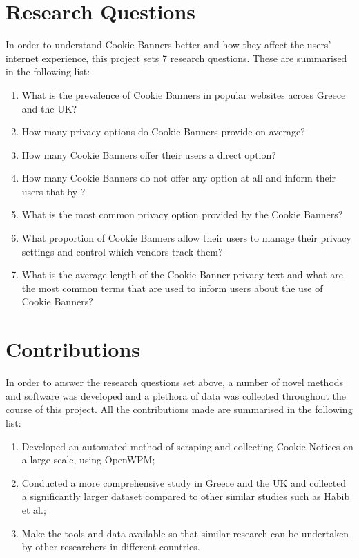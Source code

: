 \documentclass[../main.tex]{subfiles}
\begin{document}
\section{Research Questions}

In order to understand Cookie Banners better and how they affect the users’ internet experience, this project sets 7 research questions. These are summarised in the following list:

\begin{enumerate}[label=\textbf{RQ\arabic*}:, ref=RQ\arabic*, leftmargin=1.65cm]
    \item \label{rq:prevalence} What is the prevalence of Cookie Banners in popular websites across Greece and the UK? 
    \item \label{rq:options_avg} How many privacy options do Cookie Banners provide on average?
    \item \label{rq:direct_opt_out} How many Cookie Banners offer their users a direct  option?
    \item \label{rq:no_options} How many Cookie Banners do not offer any option at all and inform their users that by ?
    \item \label{rq:common_ctas} What is the most common privacy option provided by the Cookie Banners? 
    \item \label{rq:manage_options_count} What proportion of Cookie Banners allow their users to manage their privacy settings and control which vendors track them?
    \item \label{rq:common_privacy_txt} What is the average length of the Cookie Banner privacy text and what are the most common terms that are used to inform users about the use of Cookie Banners?
\end{enumerate}
    
\section{Contributions}

In order to answer the research questions set above, a number of novel methods and software was developed and a plethora of data was collected throughout the course of this project. All the contributions made are summarised in the following list:

\begin{enumerate}
    \item \label{contr_1} Developed an automated method of scraping and collecting Cookie Notices on a large scale, using OpenWPM;
    \item \label{contr_2} Conducted a more comprehensive study in Greece and the UK and collected a significantly larger dataset compared to other similar studies such as Habib et al.;
    \item \label{contr_3} Make the tools and data available so that similar research can be undertaken by other researchers in different countries.
\end{enumerate}
\end{document}
